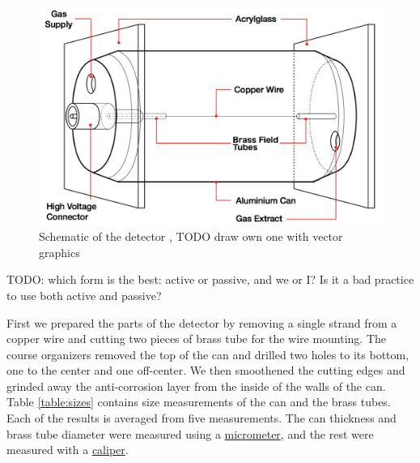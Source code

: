 \documentclass[a4paper]{article}
\begin{document}
\begin{figure}[ht!]
\centering
\includegraphics[width=\textwidth]{fig/instructions/schematic.png}
\caption{Schematic of the detector \cite{instructions}, TODO draw own one with vector graphics}
\label{fig:schematic}
\end{figure}

TODO: which form is the best: active or passive, and we or I? Is it a bad practice to use both active and passive?

First we prepared the parts of the detector by removing a single strand from a copper wire and cutting two pieces of brass tube for the wire mounting.
The course organizers removed the top of the can and drilled two holes to its bottom, one to the center and one off-center.
We then smoothened the cutting edges and grinded away the anti-corrosion layer from the inside of the walls of the can.
Table \ref{table:sizes} contains size measurements of the can and the brass tubes.
Each of the results is averaged from five measurements.
The can thickness and brass tube diameter were measured using a
\href{https://en.wikipedia.org/wiki/Micrometer}{micrometer}, and the rest were measured with a
\href{https://en.wikipedia.org/wiki/Calipers}{caliper}.
\end{document}
